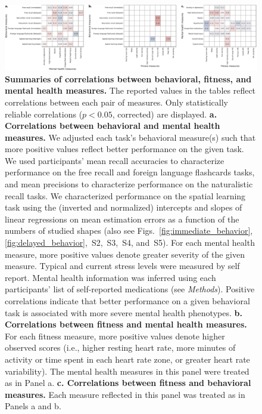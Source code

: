 \documentclass[10pt]{article}
\newcommand{\frDetail}{S2}
\newcommand{\natDetail}{S3}
\newcommand{\vocabDetail}{S4}
\newcommand{\spatialDetail}{S5}
\begin{document}
\begin{figure}[tp]
\centering
\includegraphics[width=\textwidth]{figs/combined_correlations_main}
\caption{\textbf{Summaries of correlations between behavioral,
    fitness, and mental health measures.}  The reported values in the
  tables reflect correlations between each pair of measures.  Only statistically reliable correlations
  ($p < 0.05$, corrected) are displayed.  \textbf{a. Correlations
    between behavioral and mental health measures.}  We adjusted each
  task's behavioral measure(s) such that more positive values reflect
  better performance on the given task.  We used participants' mean
  recall accuracies to characterize performance on the free recall and
  foreign language flashcards tasks, and mean precisions to
  characterize performance on the naturalistic recall tasks.  We
  characterized performance on the spatial learning task using the
  (inverted and normalized) intercepts and slopes of linear
  regressions on mean estimation errors as a function of the numbers of
  studied shapes (also see Figs.~\ref{fig:immediate_behavior},
  \ref{fig:delayed_behavior},~\frDetail,~\natDetail,~\vocabDetail,
  and~\spatialDetail).  For each mental health measure, more positive
  values denote greater severity of the given measure.  Typical and
  current stress levels were measured by self report.  Mental health
  information was inferred using each participants' list of
  self-reported medications (see \textit{Methods}).  Positive
  correlations indicate that better performance on a given behavioral
  task is associated with more severe mental health phenotypes.
  \textbf{b. Correlations between fitness and mental health measures.}
  For each fitness measure, more positive values denote higher
  observed scores (i.e., higher resting heart rate, more minutes of
  activity or time spent in each heart rate zone, or greater heart
  rate variability).  The mental health measures in this panel were
  treated as in Panel a.  \textbf{c. Correlations between fitness and
    behavioral measures.}  Each measure reflected in this panel was
  treated as in Panels a and b.}
\label{fig:corr_summaries}
\end{figure}
\end{document}
